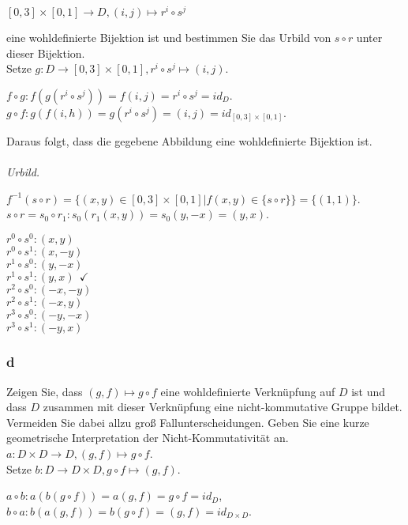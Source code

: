 \documentclass[a4paper,graphics,11pt]{article}
\newcommand\aufgabenteil[1]{\subsubsection*{#1}}
\begin{document}
\begin{center}
$[0,3] \times [0,1] \to D, (i,j) \mapsto r^{i} \circ s^{j}$
\end{center}
eine wohldefinierte Bijektion ist und bestimmen Sie das Urbild von $s \circ r$ unter dieser Bijektion.\\
Setze $g:D \to [0,3] \times [0,1], r^{i} \circ s^{j} \mapsto (i,j)$.\\
\begin{center}
$f \circ g: f(g(r^{i} \circ s^{j})) = f(i,j) = r^{i} \circ s^{j} = id_{D}$.\\
$g \circ f: g(f(i,h)) = g(r^{i} \circ s^{j}) = (i,j) = id_{[0,3] \times [0,1]}$.\\
\end{center}
Daraus folgt, dass die gegebene Abbildung eine wohldefinierte Bijektion ist.\\ \\
\emph{Urbild.}
\begin{center}
$f^{-1}(s \circ r)=\{(x,y) \in [0,3] \times [0,1] | f(x,y) \in \{s \circ r \} \} = \{(1,1)\}$.\\
$s \circ r = s_{0} \circ r_{1}: s_{0}(r_{1}(x,y)) = s_{0}(y,-x) = (y,x)$.\\
\end{center}
$r^{0} \circ s^{0}:(x,y) ~~ $\\
$r^{0} \circ s^{1}:(x,-y)~~ $\\ 
$r^{1} \circ s^{0}:(y,-x)~~ $\\
$r^{1} \circ s^{1}:(y,x)~~\checkmark $\\
$r^{2} \circ s^{0}:(-x,-y)~~ $\\
$r^{2} \circ s^{1}:(-x,y)~~ $\\
$r^{3} \circ s^{0}:(-y,-x)~~ $\\
$r^{3} \circ s^{1}:(-y,x)~~ $
\aufgabenteil{d}
Zeigen Sie, dass $(g,f) \mapsto g \circ f$ eine wohldefinierte Verkn{\"u}pfung auf $D$ ist und dass $D$ zusammen mit dieser Verkn{\"u}pfung eine nicht-kommutative Gruppe bildet. Vermeiden Sie dabei allzu gro{\ss} Fallunterscheidungen. Geben Sie eine kurze geometrische Interpretation der Nicht-Kommutativit{\"a}t an.\\
$a:D\times D \to D, (g,f) \mapsto g\circ f$.\\
Setze $b: D \to D \times D, g\circ f \mapsto (g,f)$.
\begin{center}
$a \circ b : a(b(g \circ f)) = a(g,f) = g \circ f = id_{D}$,\\
$b \circ a : b(a(g,f)) = b(g \circ f) = (g,f) = id_{D \times D}$.
\end{center}
\end{document}

